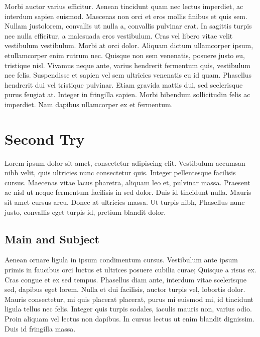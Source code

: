 \documentclass[12pt,a4paper]{memoir}
\begin{document}
Morbi auctor varius efficitur. Aenean tincidunt quam nec lectus imperdiet, ac interdum sapien euismod. Maecenas non orci et eros mollis finibus et quis sem. Nullam justo\pleasecite lorem, convallis ut nulla a, convallis pulvinar erat. In sagittis turpis nec nulla efficitur, a malesuada eros vestibulum. Cras vel libero vitae velit vestibulum vestibulum. Morbi at orci dolor. Aliquam dictum ullamcorper ipsum, et ullamcorper enim rutrum nec. Quisque non sem venenatis, posuere justo eu, tristique nisl. Vivamus neque ante, varius hendrerit fermentum quis, vestibulum nec felis. Suspendisse et sapien vel sem ultricies venenatis eu id quam. Phasellus hendrerit dui vel tristique pulvinar. Etiam gravida mattis dui, sed scelerisque purus feugiat at. Integer in fringilla sapien. Morbi bibendum sollicitudin felis ac imperdiet. Nam dapibus ullamcorper ex et fermentum.

\chapter{Second Try}



Lorem ipsum dolor sit amet, consectetur adipiscing elit. Vestibulum accumsan nibh velit, quis ultricies nunc consectetur quis. Integer pellentesque facilisis cursus. Maecenas vitae lacus pharetra, aliquam leo et, pulvinar massa. Praesent ac nisl ut neque fermentum facilisis in sed dolor. Duis id tincidunt nulla. Mauris sit amet cursus arcu. Donec at ultricies massa. Ut turpis nibh,  Phasellus nunc justo, convallis eget turpis id, pretium blandit dolor.

\section{Main and Subject}


 Aenean ornare ligula in ipsum condimentum cursus. Vestibulum ante ipsum primis in faucibus orci luctus et ultrices posuere cubilia curae; Quisque a risus ex. Cras congue et ex sed tempus. Phasellus diam ante, interdum vitae scelerisque sed, dapibus eget lorem. Nulla et dui facilisis, auctor turpis vel, lobortis dolor. Mauris consectetur, mi quis placerat placerat, purus mi euismod mi, id tincidunt ligula tellus nec felis. Integer quis turpis sodales, iaculis mauris non, varius odio. Proin aliquam vel lectus non dapibus. In cursus lectus ut enim blandit dignissim. Duis id fringilla massa.
\end{document}
